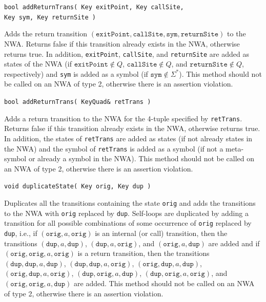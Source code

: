 \documentclass{llncs}
\begin{document}
\begin{description}
  \item\texttt{bool addReturnTrans( Key exitPoint, Key callSite,\\ \hspace*{3.25cm} Key sym, Key returnSite )} \nopagebreak

    Adds the return transition $(\texttt{exitPoint},\texttt{callSite},\texttt{sym},\texttt{returnSite})$ to the NWA.  Returns false if this transition already exists in the NWA, otherwise returns true.  In addition, \texttt{exitPoint}, \texttt{callSite}, and \texttt{returnSite} are added as states of the NWA (if $\texttt{exitPoint} \not\in Q$, $\texttt{callSite} \not\in Q$, and $\texttt{returnSite} \not\in Q$, respectively) and \texttt{sym} is added as a symbol (if $\texttt{sym} \not\in \Sigma^*$).  This method should not be called on an NWA of type 2, otherwise there is an assertion violation.

  \item\texttt{bool addReturnTrans( KeyQuad\& retTrans )} \nopagebreak

    Adds a return transition to the NWA for the 4-tuple specified by \texttt{retTrans}.  Returns false if this transition already exists in the NWA, otherwise returns true.  In addition, the states of \texttt{retTrans} are added as states (if not already states in the NWA) and the symbol of \texttt{retTrans} is added as a symbol (if not a meta-symbol or already a symbol in the NWA).  This method should not be called on an NWA of type 2, otherwise there is an assertion violation.

  \item\texttt{void duplicateState( Key orig, Key dup )} \nopagebreak

    Duplicates all the transitions containing the state \texttt{orig} and adds the transitions to the NWA with \texttt{orig} replaced by \texttt{dup}.  Self-loops are duplicated by adding a transition for all possible combinations of some occurrence of \texttt{orig} replaced by \texttt{dup}, i.e., if $(\texttt{orig},a,\texttt{orig})$ is an internal (or call) transition, then the transitions $(\texttt{dup},a,\texttt{dup})$, $(\texttt{dup},a,\texttt{orig})$, and $(\texttt{orig},a,\texttt{dup})$ are added and if $(\texttt{orig},\texttt{orig},a,\texttt{orig})$ is a return transition, then the transitions $(\texttt{dup},\texttt{dup},a,\texttt{dup})$, $(\texttt{dup},\texttt{dup},a,\texttt{orig})$,  $(\texttt{orig},\texttt{dup},a,\texttt{dup})$, $(\texttt{orig},\texttt{dup},a,\texttt{orig})$, $(\texttt{dup},\texttt{orig},a,\texttt{dup})$, $(\texttt{dup},\texttt{orig},a,\texttt{orig})$, and $(\texttt{orig},\texttt{orig},a,\texttt{dup})$ are added.  This method should not be called on an NWA of type 2, otherwise there is an assertion violation.


\end{description}
\end{document}
